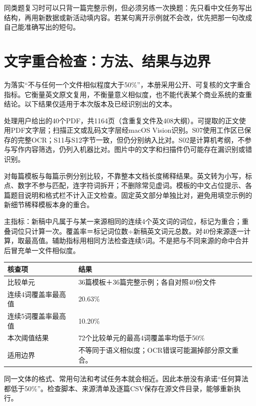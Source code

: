 \documentclass[11pt,a4paper,fontset=macnew]{ctexart}
\begin{document}
同类题复习时可以只背一篇完整示例，但必须另练一次换题：先只看中文任务写出结构，再用新数据或新活动填内容。若某句离开示例就不会改，优先把那一句改成自己能准确写出的短句。

\clearpage\section*{文字重合检查：方法、结果与边界}
为落实“不与任何一个文件相似程度大于50\%”，本册采用公开、可复核的文字重合指标。它衡量英文原文复用，不衡量意义相似度，也不能代表某个商业系统的查重结论。以下结果仅适用于本次版本及已经识别出的文本。

\par\vspace{4pt}{\bfseries 比较范围与计算方法}\par\nopagebreak
处理用户给出的40个PDF，共1164页（含重复文件及408大纲）。可提取的正文使用PDF文字层；扫描正文或乱码文字层经macOS Vision识别。S07使用工作区已保存的完整OCR；S11与S12字节一致，但仍分别纳入比对。S02是计算机考纲，不参与写作内容筛选，仍列入机器比对。图片中的文字和扫描件仍可能存在漏识别或错识别。

对每篇模板与每篇示例分别比较，不靠整本文档长度稀释结果。英文转为小写，标点、数字不参与匹配，连字符词拆开；不删除常见虚词。模板的中文占位提示、各篇题目说明和格式栏不计入正文检查。固定英文部分单独比对，避免用填空示例的新细节稀释模板本身的重合。

主指标：新稿中凡属于与某一来源相同的连续4个英文词的词位，标记为重合；重叠词位只计算一次。覆盖率＝标记词位数÷新稿英文词元总数。对40份来源逐一计算，取最高值。辅助指标用相同方法检查连续5词。不是把与不同来源的命中合并后冒充单一文件相似度。

\begin{longtable}{L{70mm}L{87mm}}\toprule
\textbf{核查项} & \textbf{结果}\\\midrule\endhead
比较单元 & 36篇模板＋36篇完整示例；各自对照40份文件\\
连续4词覆盖率最高值 & 20.63\%\\
连续5词覆盖率最高值 & 10.20\%\\
本次阈值结果 & 72个比较单元的最高4词覆盖率均低于50\%\\
适用边界 & 不等同于语义相似度；OCR错误可能漏掉部分原文重合。\\
\bottomrule\end{longtable}
同一文体的格式、常用句法和考试任务本就会相近。因此本册没有承诺“任何算法都低于50\%”。检查脚本、来源清单及逐篇CSV保存在源文件目录，能够重新执行。
\end{document}
